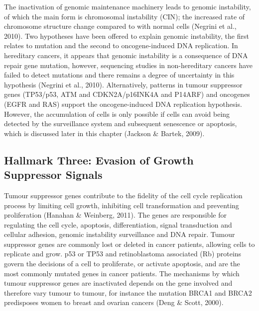 \documentclass[a4paper, twoside]{templates/ociamthesis}
\begin{document}
The inactivation of genomic maintenance machinery leads to genomic instability, of which the main form is chromosomal instability (CIN); the increased rate of chromosome structure change compared to with normal cells (Negrini et al., 2010). Two hypotheses have been offered to explain genomic instability, the first relates to mutation and the second to oncogene-induced DNA replication. In hereditary cancers, it appears that genomic instability is a consequence of DNA repair gene mutation, however, sequencing studies in non-hereditary cancers have failed to detect mutations and there remains a degree of uncertainty in this hypothesis (Negrini et al., 2010). Alternatively, patterns in tumour suppressor genes (TP53/p53, ATM and CDKN2A/p16INK4A and P14ARF) and oncogenes (EGFR and RAS) support the oncogene-induced DNA replication hypothesis. However, the accumulation of cells is only possible if cells can avoid being detected by the surveillance system and subsequent senescence or apoptosis, which is discussed later in this chapter (Jackson \& Bartek, 2009).

\hypertarget{hallmark-three-evasion-of-growth-suppressor-signals}{%
\subsection{Hallmark Three: Evasion of Growth Suppressor Signals}\label{hallmark-three-evasion-of-growth-suppressor-signals}}

Tumour suppressor genes contribute to the fidelity of the cell cycle replication process by limiting cell growth, inhibiting cell transformation and preventing proliferation (Hanahan \& Weinberg, 2011). The genes are responsible for regulating the cell cycle, apoptosis, differentiation, signal transduction and cellular adhesion, genomic instability surveillance and DNA repair. Tumour suppressor genes are commonly lost or deleted in cancer patients, allowing cells to replicate and grow. p53 or TP53 and retinoblastoma associated (Rb) proteins govern the decisions of a cell to proliferate, or activate apoptosis, and are the most commonly mutated genes in cancer patients. The mechanisms by which tumour suppressor genes are inactivated depends on the gene involved and therefore vary tumour to tumour, for instance the mutation BRCA1 and BRCA2 predisposes women to breast and ovarian cancers (Deng \& Scott, 2000).
\end{document}
